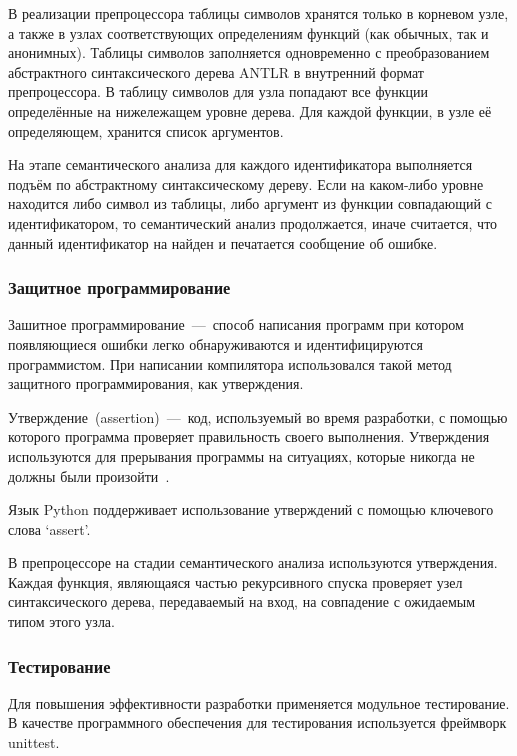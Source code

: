 \documentclass[12pt,a4paper,oneside]{extarticle}
\begin{document}
            В реализации препроцессора таблицы символов хранятся только в корневом узле, а также в узлах соответствующих определениям функций (как обычных, так и анонимных). Таблицы символов заполняется одновременно с преобразованием абстрактного синтаксического дерева ANTLR в внутренний формат препроцессора. В таблицу символов для узла попадают все функции определённые на нижележащем уровне дерева. Для каждой функции, в узле её определяющем, хранится список аргументов.

            На этапе семантического анализа для каждого идентификатора выполняется подъём по абстрактному синтаксическому дереву. Если на каком-либо уровне находится либо символ из таблицы, либо аргумент из функции совпадающий с идентификатором, то семантический анализ продолжается, иначе считается, что данный идентификатор на найден и печатается сообщение об ошибке.

        \subsubsection{Защитное программирование}
            Зашитное программирование~---~способ написания программ при котором появляющиеся ошибки легко обнаруживаются и идентифицируются программистом.
            При написании компилятора использовался такой метод защитного программирования, как утверждения.

            Утверждение~(assertion)~---~код, используемый во время разработки, с помощью которого программа проверяет правильность своего выполнения. Утверждения используются для прерывания программы на ситуациях, которые никогда не должны были произойти~\cite{mcconnell}.

            Язык Python поддерживает использование утверждений с помощью ключевого слова `assert'. 

            В препроцессоре на стадии семантического анализа используются утверждения. Каждая функция, являющаяся частью рекурсивного спуска проверяет узел синтаксического дерева, передаваемый на вход, на совпадение с ожидаемым типом этого узла.

        \subsubsection{Тестирование}
            Для повышения эффективности разработки применяется модульное тестирование.
            В качестве программного обеспечения для тестирования используется фреймворк unittest.
\end{document}
